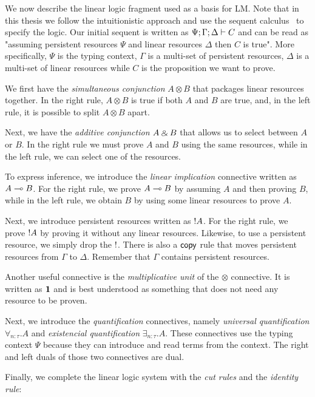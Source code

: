 We now describe the linear logic fragment used as a basis for LM.  Note that in
this thesis we follow the intuitionistic approach and use the sequent
calculus~\cite{gen35} to specify the logic. Our initial sequent is written as
$\Psi; \Gamma ; \Delta \vdash C$ and can be read as "assuming persistent
resources $\Psi$ and linear resources $\Delta$ then $C$ is true".  More
specifically, $\Psi$ is the typing context, $\Gamma$ is a multi-set of
persistent resources, $\Delta$ is a multi-set of linear resources while $C$ is
the proposition we want to prove.

We first have the \emph{simultaneous conjunction} $A \otimes B$ that packages
linear resources together. In the right rule, $A \otimes B$ is true if both $A$
and $B$ are true, and, in the left rule, it is possible to split $A \otimes B$
apart.



Next, we have the \emph{additive conjunction} $A \mathbin{\binampersand} B$ that allows us to
select between $A$ or $B$. In the right rule we must prove $A$ and $B$ using
the same resources, while in the left rule, we can select one of the
resources.



To express inference, we introduce the \emph{linear implication} connective
written as $A \multimap B$. For the right rule, we prove $A \multimap B$ by assuming
$A$ and then proving $B$, while in the left rule, we obtain $B$ by using some
linear resources to prove $A$.



Next, we introduce persistent resources written as ${!} A$. For the right
rule, we prove ${!} A$ by proving it without any linear resources. Likewise,
to use a persistent resource, we simply drop the $
{!}$. There is also a $\mathsf{copy}$ rule that moves persistent resources from
$\Gamma$ to $\Delta$. Remember that $\Gamma$ contains persistent resources.



Another useful connective is the \emph{multiplicative unit} of the $\otimes$
connective. It is written as $\mathbf{1}$ and is best understood as something that
does not need any resource to be proven.



Next, we introduce the \emph{quantification} connectives, namely \emph{universal
quantification} $\forall_{n:\tau}. A$ and \emph{existencial quantification}
$\exists_{n:\tau}. A$. These connectives use the typing context $\Psi$ because
they can introduce and read terms from the context. The right and left duals of
those two connectives are dual.



Finally, we complete the linear logic system with the \emph{cut rules} and the
\emph{identity rule}:




